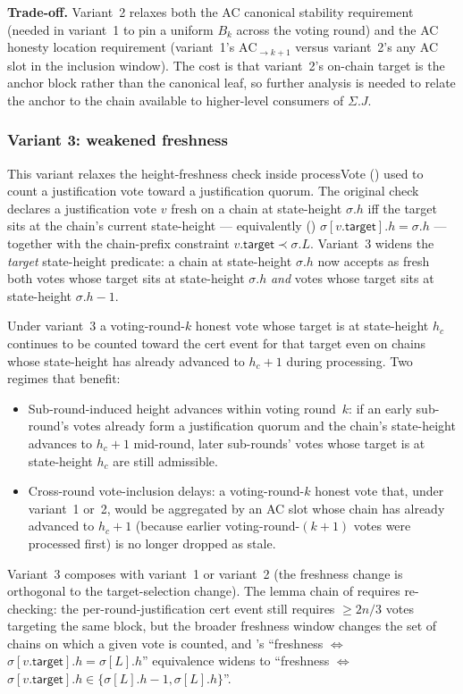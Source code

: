 \ifx\litemode\undefined\documentclass{article}\fi
\newcommand{\target}{\mathsf{target}}
\newcommand{\processVote}{\textsf{processVote}\xspace}
\renewcommand{\paragraph}[1]{\vspace{7pt}\noindent\textbf{#1}}
\theoremstyle{plain}
\theoremstyle{definition}
\theoremstyle{remark}
\begin{document}
\paragraph{Trade-off.}
Variant~2 relaxes both the AC canonical stability requirement (needed in variant~1 to pin a uniform $B_k$ across the voting round) and the AC honesty location requirement (variant~1's $\mathrm{AC}_{\to k+1}$ versus variant~2's any AC slot in the inclusion window).
The cost is that variant~2's on-chain target is the anchor block rather than the canonical leaf, so further analysis is needed to relate the anchor to the chain available to higher-level consumers of $\Sigma.J$.

\iffalse
\subsubsection{Variant 3: weakened freshness}
This variant relaxes the height-freshness check inside \processVote{} () used to count a justification vote toward a justification quorum.
The original check declares a justification vote $v$ fresh on a chain at state-height $\sigma.h$ iff the target sits at the chain's current state-height --- equivalently () $\sigma[v.\target].h = \sigma.h$ --- together with the chain-prefix constraint $v.\target \prec \sigma.L$.
Variant~3 widens the \emph{target} state-height predicate: a chain at state-height $\sigma.h$ now accepts as fresh both votes whose target sits at state-height $\sigma.h$ \emph{and} votes whose target sits at state-height $\sigma.h - 1$.

Under variant~3 a voting-round-$k$ honest vote whose target is at state-height $h_c$ continues to be counted toward the cert event for that target even on chains whose state-height has already advanced to $h_c + 1$ during processing.
Two regimes that benefit:
\begin{itemize}
  \item Sub-round-induced height advances within voting round~$k$: if an early sub-round's votes already form a justification quorum and the chain's state-height advances to $h_c + 1$ mid-round, later sub-rounds' votes whose target is at state-height $h_c$ are still admissible.
  \item Cross-round vote-inclusion delays: a voting-round-$k$ honest vote that, under variant~1 or~2, would be aggregated by an AC slot whose chain has already advanced to $h_c + 1$ (because earlier voting-round-$(k+1)$ votes were processed first) is no longer dropped as stale.
\end{itemize}
Variant~3 composes with variant~1 or variant~2 (the freshness change is orthogonal to the target-selection change).
The lemma chain of  requires re-checking: the per-round-justification cert event still requires $\geq 2n/3$ votes targeting the same block, but the broader freshness window changes the set of chains on which a given vote is counted, and 's ``freshness $\iff$ $\sigma[v.\target].h = \sigma[L].h$'' equivalence widens to ``freshness $\iff$ $\sigma[v.\target].h \in \{\sigma[L].h - 1, \sigma[L].h\}$''.
\end{document}
